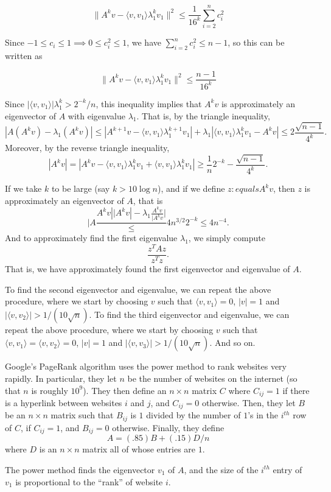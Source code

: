 \[
\lVert A^kv - \langle v, v_1 \rangle \lambda_1^k v_1 \rVert^2  \leq  \frac{1}{16^k} \sum_{i=2}^n c_i^2
\]

Since \(-1 \leq c_i \leq 1 \implies 0 \leq c_i^2 \leq 1\), we have \(\sum_{i=2}^n c_i^2 \leq n- 1\), so this can be written as

\[
\boxed{
\lVert A^kv - \langle v, v_1 \rangle \lambda_1^k v_1 \rVert^2  \leq  \frac{n-1}{16^k} }
\]

\begin{remark} Since $|\langle v,v_{1}\rangle|\lambda_{1}^{k}>2^{-k}/n$, this inequality implies that $A^{k}v$ is approximately an eigenvector of $A$ with eigenvalue $\lambda_{1}$.  That is, by the triangle inequality,
$$|A(A^{k}v)-\lambda_{1}(A^{k}v)|
\leq|A^{k+1}v-\langle v,v_{1}\rangle\lambda_{1}^{k+1}v_{1}|
+\lambda_{1}|\langle v,v_{1}\rangle\lambda_{1}^{k}v_{1}-A^{k}v|\leq 2\frac{\sqrt{n-1}}{4^{k}}.$$
Moreover, by the reverse triangle inequality,
$$|A^{k}v|=|A^{k}v-\langle v,v_{1}\rangle\lambda_{1}^{k}v_{1}+\langle v,v_{1}\rangle\lambda_{1}^{k}v_{1}|
\geq\frac{1}{n}2^{-k}-\frac{\sqrt{n-1}}{4^{k}}.$$

If we take $k$ to be large (say $k>10\log n$), and if we define $z : equals A^{k}v$, then $z$ is approximately an eigenvector of $A$, that is
$$|A\frac{A^{k}v|{|A^{k}v}|-\lambda_{1}\frac{A^{k}v}{|A^{k}v}|}\leq 4n^{3/2}2^{-k}\leq 4n^{-4}.$$
And to approximately find the first eigenvalue $\lambda_{1}$, we simply compute
$$\frac{z^{T}Az}{z^{T}z}.$$
That is, we have approximately found the first eigenvector and eigenvalue of $A$.

To find the second eigenvector and eigenvalue, we can repeat the above procedure, where we start by choosing $v$ such that $\langle v,v_{1}\rangle=0$, $|v|=1$ and $|\langle v,v_{2}\rangle|>1/(10\sqrt{n})$.  To find the third eigenvector and eigenvalue, we can repeat the above procedure, where we start by choosing $v$ such that $\langle v,v_{1}\rangle=\langle v,v_{2}\rangle=0$, $|v|=1$ and $|\langle v,v_{3}\rangle|>1/(10\sqrt{n})$.  And so on.

Google's PageRank algorithm uses the power method to rank websites very rapidly.  In particular, they let $n$ be the number of websites on the internet (so that $n$ is roughly $10^{9}$).  They then define an $n\times n$ matrix $C$ where $C_{ij}=1$ if there is a hyperlink between websites $i$ and $j$, and $C_{ij}=0$ otherwise.  Then, they let $B$ be an $n\times n$ matrix such that $B_{ij}$ is $1$ divided by the number of $1$'s in the $i^{th}$ row of $C$, if $C_{ij}=1$, and $B_{ij}=0$ otherwise.  Finally, they define
$$A=(.85)B+(.15)D/n$$
where $D$ is an $n\times n$ matrix all of whose entries are $1$.

The power method finds the eigenvector $v_{1}$ of $A$, and the size of the $i^{th}$ entry of $v_{1}$ is proportional to the ``rank'' of website $i$.
\end{remark}

